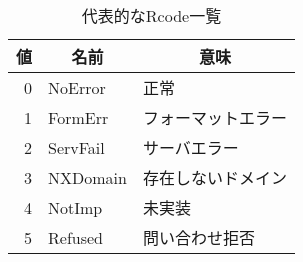 \begin{table}[htbp]
 \caption{代表的なRcode一覧}
 \centering
  \begin{tabular}{rll}
    \toprule
		\multicolumn{1}{c}{\textbf{値}} & \multicolumn{1}{c}{\textbf{名前}} & \multicolumn{1}{c}{\textbf{意味}}\\
    \midrule
    0 & NoError & 正常\\
    1 & FormErr & フォーマットエラー\\
    2 & ServFail & サーバエラー\\
    3 & NXDomain & 存在しないドメイン\\
    4 & NotImp & 未実装\\
    5 & Refused & 問い合わせ拒否\\
    \bottomrule
  \end{tabular}
 \label{tab:dns-rcode}
\end{table}
